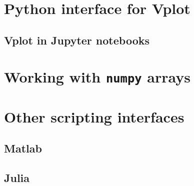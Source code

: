 \section{Python interface for Vplot}

\subsection{Vplot in Jupyter notebooks}

\section{Working with \texttt{numpy} arrays}

\section{Other scripting interfaces}

\subsection{Matlab}

\subsection{Julia}
